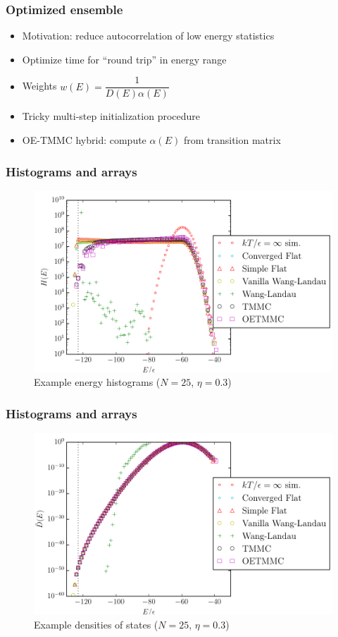 \documentclass{beamer}
\newcommand{\f}[2]{\dfrac{#1}{#2}} %
\newcommand{\p}[1]{\left(#1\right)} %
\let\olditem\item
\renewcommand{\item}{\setlength{\itemsep}{6pt}\olditem}
\begin{document}
\begin{frame}
  \frametitle{Optimized ensemble}
  \begin{itemize}
  \item Motivation: reduce autocorrelation of low energy statistics
  \item Optimize time for ``round trip'' in energy range
  \item Weights $w\p{E}=\f1{D\p{E}\alpha\p{E}}$
  \item Tricky multi-step initialization procedure
  \item OE-TMMC hybrid: compute $\alpha\p{E}$ from transition matrix
  \end{itemize}
\end{frame}

\begin{frame}
  \frametitle{Histograms and arrays}
  \begin{figure}
    \centering
    \includegraphics[height=0.75\textheight]{figs/hist-example.pdf}
    \caption{Example energy histograms ($N=25$, $\eta=0.3$)}
  \end{figure}
\end{frame}

\begin{frame}
  \frametitle{Histograms and arrays}
  \begin{figure}
    \centering
    \includegraphics[height=0.75\textheight]{figs/dos-example.pdf}
    \caption{Example densities of states ($N=25$, $\eta=0.3$)}
  \end{figure}
\end{frame}
\end{document}
